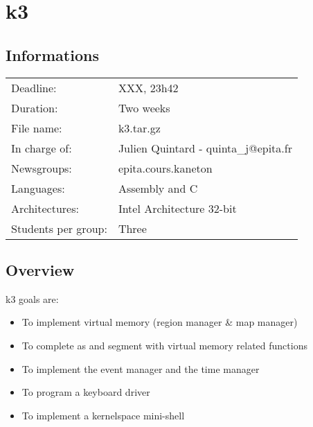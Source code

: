 
%
%

\section{k3}

%
%

\subsection{Informations}

\begin{tabular}{p{7cm}l}
Deadline: & XXX, 23h42 \\
Duration: & Two weeks \\
File name: & k3.tar.gz \\
In charge of: & Julien Quintard - \small{quinta\_j@epita.fr} \\
Newsgroups: & epita.cours.kaneton \\
Languages: & Assembly and C \\
Architectures: & Intel Architecture 32-bit \\
Students per group: & Three \\
\end{tabular}

%
%

\subsection{Overview}

k3 goals are:

\begin{itemize}

\item To implement virtual memory (region manager \& map manager)

\item To complete as and segment with virtual memory related functions

\item To implement the event manager and the time manager

\item To program a keyboard driver

\item To implement a kernelspace mini-shell

\end{itemize}

